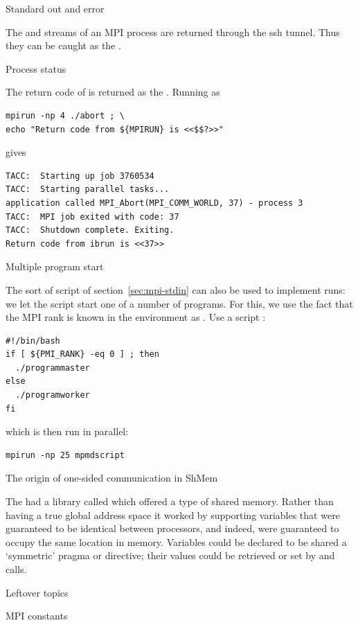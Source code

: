  {Standard out and error}

The  and  streams of an MPI
process are returned through the ssh tunnel. Thus they can be caught
as the .


 {Process status}

The return code of  is returned as the
.
Running
as
\begin{verbatim}
mpirun -np 4 ./abort ; \
echo "Return code from ${MPIRUN} is <<$$?>>"
\end{verbatim}
gives
\begin{verbatim}
TACC:  Starting up job 3760534
TACC:  Starting parallel tasks...
application called MPI_Abort(MPI_COMM_WORLD, 37) - process 3
TACC:  MPI job exited with code: 37
TACC:  Shutdown complete. Exiting.
Return code from ibrun is <<37>>
\end{verbatim}

 {Multiple program start}

The sort of script of section~\ref{sec:mpi-stdin}
can also be used to implement  runs:
we let the script start one of a number of programs. For this, we use
the fact that the MPI rank is known in the environment as
. Use a script :
\begin{verbatim}
#!/bin/bash
if [ ${PMI_RANK} -eq 0 ] ; then
  ./programmaster
else
  ./programworker
fi
\end{verbatim}
which is then run in parallel:
\begin{verbatim}
mpirun -np 25 mpmdscript
\end{verbatim}

 {The origin of one-sided communication in ShMem}

The  had a library called 
which offered a type of shared memory. Rather than having a true
global address space it worked by supporting variables that were
guaranteed to be identical between processors, and indeed, were
guaranteed to occupy the same location in memory. Variables could be
declared to be shared a `symmetric' pragma or directive; their values
could be retrieved or set by \n{shmem_get} and \n{shmem_put} calls.

 {Leftover topics}

 {MPI constants}

